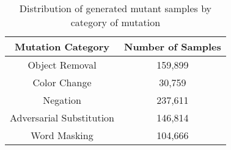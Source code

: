 

\begin{table}
    \centering
    \small
    \begin{tabular}{cc}
        \toprule
        \textbf{Mutation Category} & \textbf{Number of Samples} \\
        \midrule
        Object Removal              & 159,899   \\
        Color Change                & 30,759    \\
        Negation                    & 237,611   \\
        Adversarial Substitution    & 146,814   \\
        Word Masking                & 104,666   \\
        \bottomrule
    \end{tabular}

    \caption{Distribution of generated mutant samples by category of mutation}
    \label{tab:mutant_stats}
\end{table}